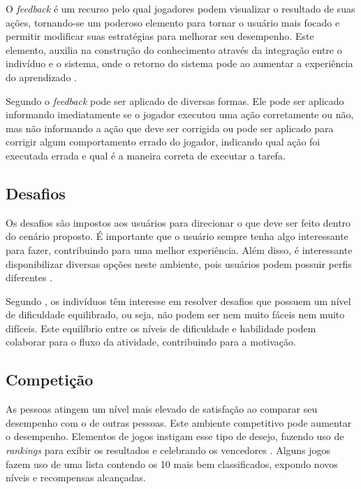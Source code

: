 \documentclass[
	12pt,				%
	oneside,			%
	a4paper,			%
	english,			%
	french,				%
	spanish,			%
	brazil,				%
	]{abntex2}
\begin{document}
O \textit{feedback} é um recurso pelo qual jogadores podem visualizar o resultado de suas ações, tornando-se um poderoso elemento para tornar o usuário mais focado e permitir modificar suas estratégias para melhorar seu desempenho. Este elemento, auxilia na construção do conhecimento através da integração entre o indivíduo e o sistema, onde o retorno do sistema pode ao aumentar a experiência do aprendizado \cite{fardo2013gamificaccao}.

Segundo \citet{andre2018} o \textit{feedback} pode ser aplicado de diversas formas. Ele pode ser aplicado informando imediatamente se o jogador executou uma ação corretamente ou não, mas não informando a ação que deve ser corrigida ou pode ser aplicado para corrigir algum comportamento errado do jogador, indicando qual ação foi executada errada e qual é a maneira correta de executar a tarefa.

\subsection{Desafios}                

Os desafios são impostos aos usuários para direcionar o que deve ser feito dentro do cenário proposto. É importante que o usuário sempre tenha algo interessante para fazer, contribuindo para uma melhor experiência. Além disso, é interessante disponibilizar diversas opções neste ambiente, pois usuários podem possuir perfis diferentes \cite{fardo2013gamificaccao}.

Segundo \citet{busarello2016gamificaccao}, os indivíduos têm interesse em resolver desafios que possuem um nível de dificuldade equilibrado, ou seja, não podem ser nem muito fáceis nem muito difíceis. Este equilíbrio entre os níveis de dificuldade e habilidade podem colaborar para o fluxo da atividade, contribuindo para a motivação.
    
\subsection{Competição}                    

As pessoas atingem um nível mais elevado de satisfação ao comparar seu desempenho com o de outras pessoas. Este ambiente competitivo pode aumentar o desempenho. Elementos de jogos instigam esse tipo de desejo, fazendo uso de \textit{rankings} para exibir os resultados e celebrando os vencedores  \cite{bunchball2016gamification}. Alguns jogos fazem uso de uma lista contendo os 10 mais bem classificados, expondo novos níveis e recompensas alcançadas.
\end{document}
